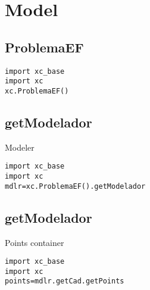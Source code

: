 \chapter{Model}


\section{ProblemaEF}
\begin{verbatim}
import xc_base
import xc
xc.ProblemaEF()
\end{verbatim}

\section{getModelador}\label{getModelador}
Modeler
\begin{verbatim}
import xc_base
import xc
mdlr=xc.ProblemaEF().getModelador
\end{verbatim}

\section{getModelador}\label{getModelador}
Points container
\begin{verbatim}
import xc_base
import xc
points=mdlr.getCad.getPoints
\end{verbatim}

